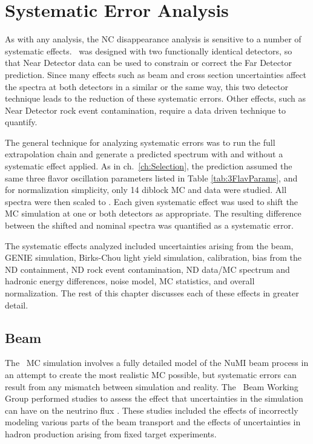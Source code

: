 \chapter{Systematic Error Analysis}
\label{ch:Systs}

As with any analysis, the NC disappearance analysis is sensitive to a number of systematic effects. \nova~was designed with two functionally identical detectors, so that Near Detector data can be used to constrain or correct the Far Detector prediction. Since many effects such as beam and cross section uncertainties affect the spectra at both detectors in a similar or the same way, this two detector technique leads to the reduction of these systematic errors. Other effects, such as Near Detector rock event contamination, require a data driven technique to quantify.

The general technique for analyzing systematic errors was to run the full extrapolation chain and generate a predicted spectrum with and without a systematic effect applied. As in ch.~\ref{ch:Selection}, the prediction assumed the same three flavor oscillation parameters listed in Table \ref{tab:3FlavParams}, and for normalization simplicity, only 14 diblock MC and data were studied. All spectra were then scaled to . Each given systematic effect was used to shift the MC simulation at one or both detectors as appropriate. The resulting difference between the shifted and nominal spectra was quantified as a systematic error.

The systematic effects analyzed included uncertainties arising from the beam, GENIE simulation, Birks-Chou light yield simulation, calibration, bias from the ND containment, ND rock event contamination, ND data/MC spectrum and hadronic energy differences, noise model, MC statistics, and overall normalization. The rest of this chapter discusses each of these effects in greater detail.

\section{Beam}

The \nova~MC simulation involves a fully detailed model of the NuMI beam process in an attempt to create the most realistic MC possible, but systematic errors can result from any mismatch between simulation and reality. The \nova~Beam Working Group performed studies to assess the effect that uncertainties in the simulation can have on the neutrino flux \cite{ref:TNBeam}. These studies included the effects of incorrectly modeling various parts of the beam transport and the effects of uncertainties in hadron production arising from fixed target experiments.

